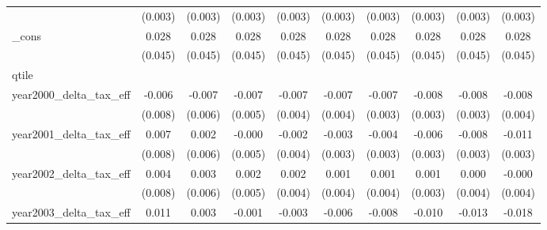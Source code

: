 {\begin{tabular}{l*{9}{c}}
            &     (0.003)         &     (0.003)         &     (0.003)         &     (0.003)         &     (0.003)         &     (0.003)         &     (0.003)         &     (0.003)         &     (0.003)         \\
[1em]
_cons       &       0.028         &       0.028         &       0.028         &       0.028         &       0.028         &       0.028         &       0.028         &       0.028         &       0.028         \\
            &     (0.045)         &     (0.045)         &     (0.045)         &     (0.045)         &     (0.045)         &     (0.045)         &     (0.045)         &     (0.045)         &     (0.045)         \\
\hline
qtile       &                     &                     &                     &                     &                     &                     &                     &                     &                     \\
year2000_delta_tax_eff&      -0.006         &      -0.007         &      -0.007         &      -0.007\sym{*}  &      -0.007\sym{**} &      -0.007\sym{**} &      -0.008\sym{**} &      -0.008\sym{**} &      -0.008\sym{**} \\
            &     (0.008)         &     (0.006)         &     (0.005)         &     (0.004)         &     (0.004)         &     (0.003)         &     (0.003)         &     (0.003)         &     (0.004)         \\
[1em]
year2001_delta_tax_eff&       0.007         &       0.002         &      -0.000         &      -0.002         &      -0.003         &      -0.004         &      -0.006\sym{**} &      -0.008\sym{***}&      -0.011\sym{***}\\
            &     (0.008)         &     (0.006)         &     (0.005)         &     (0.004)         &     (0.003)         &     (0.003)         &     (0.003)         &     (0.003)         &     (0.003)         \\
[1em]
year2002_delta_tax_eff&       0.004         &       0.003         &       0.002         &       0.002         &       0.001         &       0.001         &       0.001         &       0.000         &      -0.000         \\
            &     (0.008)         &     (0.006)         &     (0.005)         &     (0.004)         &     (0.004)         &     (0.004)         &     (0.003)         &     (0.004)         &     (0.004)         \\
[1em]
year2003_delta_tax_eff&       0.011         &       0.003         &      -0.001         &      -0.003         &      -0.006\sym{*}  &      -0.008\sym{**} &      -0.010\sym{***}&      -0.013\sym{***}&      -0.018\sym{***}\\

\end{tabular}}
